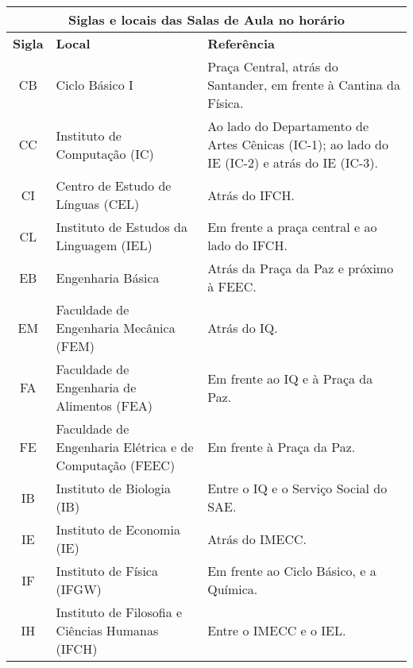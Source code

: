 \begin{table*}[ht!]
    \centering
    \begin{tabular}{|c|p{}|p{}|}\hline
        \multicolumn{3}{|c|}{ \textbf{Siglas e locais das Salas de Aula no horário}}\\ \hline

        \textbf{Sigla}  &  \textbf{Local}  &  \textbf{Referência}\\ \hline

        CB  &  Ciclo Básico I  &  Praça Central, atrás do Santander, em frente à Cantina da Física.\\ \hline

        CC  &  Instituto de Computação (IC)  &  Ao lado do Departamento de Artes Cênicas (IC-1); ao lado do IE (IC-2) e atrás do IE (IC-3).\\ \hline

        CI  &  Centro de Estudo de Línguas (CEL)  &  Atrás do IFCH.\\ \hline

        CL  &  Instituto de Estudos da Linguagem (IEL)  &  Em frente a praça central e ao lado do IFCH.\\ \hline

        EB  &  Engenharia Básica  &  Atrás da Praça da Paz e próximo à FEEC.\\ \hline

        EM  &  Faculdade de Engenharia Mecânica (FEM)  &  Atrás do IQ.\\ \hline

        FA  &  Faculdade de Engenharia de Alimentos (FEA)  &  Em frente ao IQ e à Praça da Paz.\\ \hline

        FE  &  Faculdade de Engenharia Elétrica e de Computação (FEEC)  &  Em frente à Praça da Paz.\\ \hline

        IB  &  Instituto de Biologia (IB)  &  Entre o IQ e o Serviço Social do SAE.\\ \hline

        IE  &  Instituto de Economia (IE)  &  Atrás do IMECC.\\ \hline

        IF  &  Instituto de Física (IFGW)  &  Em frente ao Ciclo Básico, e a Química.\\ \hline

        IH  &  Instituto de Filosofia e Ciências Humanas (IFCH)  &  Entre o IMECC e o IEL.\\ \hline


\end{tabular}
\end{table*}
